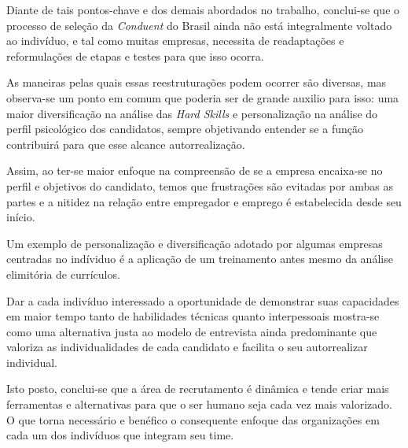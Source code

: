 \documentclass[12pt]{article}
\begin{document}
Diante de tais pontos-chave e dos demais abordados no trabalho, conclui-se que o processo de seleção da  \emph{Conduent} do Brasil ainda não está integralmente voltado ao indivíduo, e tal como muitas empresas, necessita de readaptações e reformulações de etapas e testes para que isso ocorra. 

As maneiras pelas quais essas reestruturações podem ocorrer são diversas, mas observa-se um ponto em comum que poderia ser de grande auxilio para isso: uma maior diversificação na análise das \emph{Hard Skills} e personalização na análise do perfil psicológico dos candidatos, sempre objetivando entender se a função contribuirá para que esse alcance autorrealização.

Assim, ao ter-se maior enfoque na compreensão de se a empresa encaixa-se no perfil e objetivos do candidato, temos que frustrações são evitadas por ambas as partes e a nitidez na relação entre empregador e emprego é estabelecida desde seu início. 

Um exemplo de personalização e diversificação adotado por algumas empresas centradas no indíviduo é a aplicação de um treinamento antes mesmo da análise elimitória de currículos. 

Dar a cada indivíduo interessado a oportunidade de demonstrar suas capacidades em maior tempo tanto de habilidades técnicas quanto interpessoais mostra-se como uma alternativa justa ao modelo de entrevista ainda predominante que valoriza as individualidades de cada candidato e facilita o seu autorrealizar individual. 

Isto posto, conclui-se que a área de recrutamento é dinâmica e tende criar mais ferramentas e alternativas para que o ser humano seja cada vez mais valorizado. O que torna necessário e benéfico o consequente enfoque das organizações em cada um dos indivíduos que integram seu time. 
\end{document}
